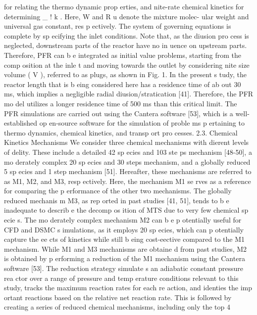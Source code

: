 \documentclass[10pt, letterpaper]{article}
\begin{document}
for relating the thermo dynamic
prop erties, and nite-rate chemical kinetics for determining \_
!
k
. Here,
W
and
R
u
denote the mixture molec-
ular weight and universal gas constant, res p ectively. The system of governing equations is complete by
sp ecifying the inlet conditions. Note that, as the diusion pro cess is neglected, downstream parts of the
reactor have no in
uence on upstream parts. Therefore, PFR can b e integrated as initial value problems,
starting from the comp osition at the inle t and moving towards the outlet by considering nite size volume
(
V
), referred to as plugs, as shown in Fig. 1.
In the present s tudy, the reactor length that is b eing considered here has a residence time of ab out 30
ms, which implies a negligible radial diusion/stratication [41]. Therefore, the PFR mo del utilizes a longer
residence time of 500 ms than this critical limit. The PFR simulations are carried out using the Cantera
software [53], which is a well-established op en-source software for the simulation of proble ms p ertaining to
thermo dynamics, chemical kinetics, and transp ort pro cesses.
2.3. Chemical Kinetics Mechanisms
We consider three chemical mechanisms with dierent levels of delity. These include a detailed 42
sp ecies and 103 ste ps mechanism [48-50], a mo derately complex 20 sp ecies and 30 steps mechanism, and a
globally reduced 5 sp ecies and 1 step mechanism [51]. Hereafter, these mechanisms are referred to as M1, M2,
and M3, resp ectively. Here, the mechanism M1 se rves as a reference for comparing the p erformance of the
other two mechanisms. The globally reduced mechanis m M3, as rep orted in past studies [41, 51], tends to b e
inadequate to describ e the decomp os ition of MTS due to very few chemical sp ecie s. The mo derately complex
mechanism M2 can b e p otentially useful for CFD and DSMC s imulations, as it employs 20 sp ecies, which
can p otentially capture the ee cts of kinetics while still b eing cost-eective compared to the M1 mechanism.
While M1 and M3 mechanisms are obtaine d from past studies, M2 is obtained by p erforming a reduction of
the M1 mechanism using the Cantera software [53]. The reduction strategy simulate s an adiabatic constant
pressure rea ctor over a range of pressure and temp erature conditions relevant to this study, tracks the
maximum reaction rates for each re action, and identies the imp ortant reactions based on the relative net
reaction rate. This is followed by creating a series of reduced chemical mechanisms, including only the top
4
\end{document}
